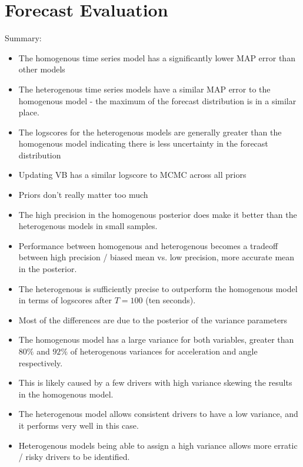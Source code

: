 \documentclass[12pt,a4paper]{article}\usepackage[]{graphicx}\usepackage[]{color}
\begin{document}
\section{Forecast Evaluation}

Summary:
\begin{itemize}
\item The homogenous time series model has a significantly lower MAP error than other models
\item The heterogenous time series models have a similar MAP error to the homogenous model - the maximum of the forecast distribution is in a similar place.
\item The logscores for the heterogenous models are generally greater than the homogenous model indicating there is less uncertainty in the forecast distribution
 \item Updating VB has a similar logscore to MCMC across all priors
 \item Priors don't really matter too much
 \item The high precision in the homogenous posterior does make it better than the heterogenous models in small samples.
 \item Performance between homogenous and heterogenous becomes a tradeoff between high precision / biased mean vs. low precision, more accurate mean in the posterior.
 \item The heterogenous is sufficiently precise to outperform the homogenous model in terms of logscores after $T = 100$ (ten seconds).
 \item Most of the differences are due to the posterior of the variance parameters
 \item The homogenous model has a large variance for both variables, greater than $80\%$ and $92\%$ of heterogenous variances for acceleration and angle respectively.
 \item This is likely caused by a few drivers with high variance skewing the results in the homogenous model.
 \item The heterogenous model allows consistent drivers to have a low variance, and it performs very well in this case.
 \item Heterogenous models being able to assign a high variance allows more erratic / risky drivers to be identified.
 \end{itemize}
\end{document}
